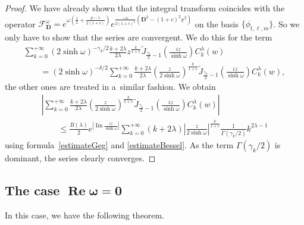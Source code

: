 \documentclass[pdftex]{sigma}
\numberwithin{equation}{section}
\numberwithin{theorem}{section}
\numberwithin{proposition}{section}
\numberwithin{lemma}{section}
\numberwithin{corollary}{section}
\numberwithin{definition}{section}
\numberwithin{example}{section}
\numberwithin{remark}{section}
\numberwithin{note}{section}
\theoremstyle{remark}
\newcommand{\cF}{\mathcal{F}}
\newcommand{\dD}{\textbf{D}}
\newcommand{\ux}{\underline{x}}
\def\l{{\lambda}}
\def\d{{\delta}}
\def\o{{\omega}}
\begin{document}
\begin{proof}
We have already shown that the integral transform coincides with the operator $\cF_{\dD}^{\o}=
e^{\o\left(\frac{1}{2}+\frac{\mu-1}{2(1+c)}\right)}e^{\frac{-\o}{2(1+c)^{2}}\left(\dD^{2}-
(1+c)^{2}\ux^{2}\right)}$ on the basis $\{\phi_{t,\ell,m}\}$.
So we only have to show that the series are convergent.
We do this for the term
\begin{gather*}
\sum_{k=0}^{+\infty} (2 \sinh{\o})^{-\gamma_{k}/2} \frac{k+2\l}{2\l} z^{\frac{k}{1+c}}
\widetilde{J}_{\frac{\gamma_{k}}{2}-1}\left(\frac{iz}{\sinh{\o}}\right) C_{k}^{\l}(w)\\
\qquad
{}= (2 \sinh{\o})^{-\d/2} \sum_{k=0}^{+\infty} \frac{k+2\l}{2\l} \left(\frac{z}{2
\sinh{\o}}\right)^{\frac{k}{1+c}}
\widetilde{J}_{\frac{\gamma_{k}}{2}-1}\left(\frac{iz}{\sinh{\o}}\right) C_{k}^{\l}(w),
\end{gather*}
the other ones are treated in a~similar fashion.
We obtain
\begin{gather*}
\left| \sum_{k=0}^{+\infty} \frac{k+2\l}{2\l} \left(\frac{z}{2 \sinh{\o}}\right)^{\frac{k}{1+c}}
\widetilde{J}_{\frac{\gamma_{k}}{2}-1}\left(\frac{iz}{\sinh{\o}}\right) C_{k}^{\l}(w) \right| \\
\qquad
{}\leq \frac{B(\l)}{2}e^{\left|\operatorname{Im}{\frac{iz}{\sinh{\o}}}\right|}\sum_{k=0}^{+\infty}(k+2\l)\left|\frac{z}{2
\sinh{\o}}\right|^{\frac{k}{1+c}} \frac{1}{\Gamma(\gamma_{k}/2)} k^{2\l-1}
\end{gather*}
using formula~\eqref{estimateGeg} and \eqref{estimateBessel}.
As the term $\Gamma(\gamma_{k}/2)$ is dominant, the series clearly converges.
\end{proof}

\subsection[The case $\operatorname{Re}\o=0$]{The case $\boldsymbol{\operatorname{Re}\o=0}$}

In this case, we have the following theorem.
\end{document}
